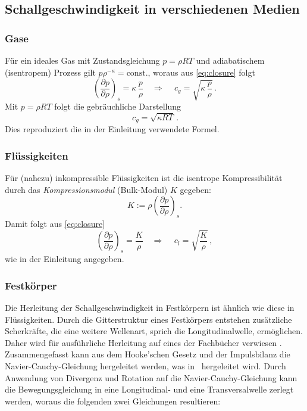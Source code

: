 \subsection{Schallgeschwindigkeit in verschiedenen Medien}

\subsubsection*{Gase}
Für ein ideales Gas mit Zustandsgleichung $p=\rho R T$ und
adiabatischem (isentropem) Prozess gilt
$p\rho^{-\kappa}=\mathrm{const.}$, woraus aus \eqref{eq:closure} folgt
\begin{equation}
    \left(\frac{\partial p}{\partial \rho}\right)_{s}=\kappa\,\frac{p}{\rho}
    \quad\Longrightarrow\quad
    \,c_g=\sqrt{\kappa\,\frac{p}{\rho}}\,.
\end{equation}
Mit $p=\rho R T$ folgt die gebräuchliche Darstellung
\begin{equation}
    \,c_g=\sqrt{\kappa R T}\,.
\end{equation}
Dies reproduziert die in der Einleitung verwendete Formel.

\subsubsection*{Flüssigkeiten}
Für (nahezu) inkompressible Flüssigkeiten ist die isentrope Kompressibilität
durch das \emph{Kompressionsmodul} (Bulk-Modul) $K$ gegeben:
\begin{equation}
    K := \rho\left(\frac{\partial p}{\partial \rho}\right)_{s}.
\end{equation}
Damit folgt aus \eqref{eq:closure}
\begin{equation}
    \left(\frac{\partial p}{\partial \rho}\right)_{s}=\frac{K}{\rho}
    \quad\Longrightarrow\quad
    \,c_l=\sqrt{\frac{K}{\rho}}\,,
\end{equation}
wie in der Einleitung angegeben.

\subsubsection*{Festkörper}
Die Herleitung der Schallgeschwindigkeit in Festkörpern ist ähnlich wie diese
in Flüssigkeiten. Durch die Gitterstruktur eines Festkörpers entstehen
zusätzliche Scherkräfte, die eine weitere Wellenart, sprich die
Longitudinalwelle, ermöglichen. Daher wird für ausführliche Herleitung
auf eines der Fachbücher verwiesen \cite{schall:landaulifschitz,schall:gurtin}.
Zusammengefasst kann aus dem Hooke'schen Gesetz und der Impulsbilanz
die Navier-Cauchy-Gleichung hergeleitet werden, was in~\cite{openfoam:navierstokes}
hergeleitet wird.
Durch Anwendung von Divergenz und Rotation auf die Navier-Cauchy-Gleichung
kann die Bewegungsgleichung in eine Longitudinal- und eine Transversalwelle
zerlegt werden, woraus die folgenden zwei Gleichungen resultieren:


